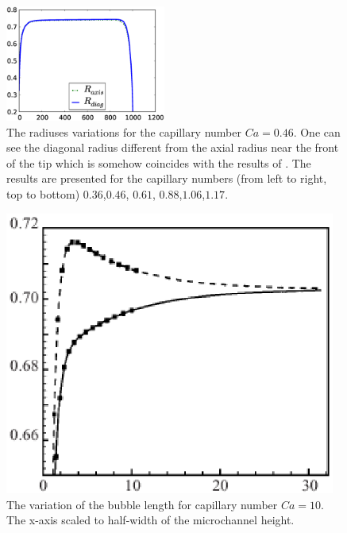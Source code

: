 \documentclass{article}
\begin{document}
\begin{figure}[ht]
\includegraphics[width=0.47\textwidth]{Figures/bubble_length_ca_117.eps}
\caption{The radiuses variations for the capillary number $Ca=0.46$.
One can see the diagonal radius different from the axial radius near the front of the tip which is
somehow coincides with the results of
\citet{heil-threedim}. The results are presented for the
capillary numbers (from left to right, top to bottom)
$0.36$,$0.46$, $0.61$, $0.88$,$1.06$,$1.17$. \label{fig:bubble:variation:capillaries}}
\end{figure}
\begin{figure}
\includegraphics[width=0.97\textwidth]{Figures/variationoverlength.eps}
\caption{The variation of the bubble length for capillary number $Ca=10$. The x-axis scaled to
half-width of the microchannel height.  \label{fig:thickness:variation:ca:ten}}
\end{figure}
\end{document}
